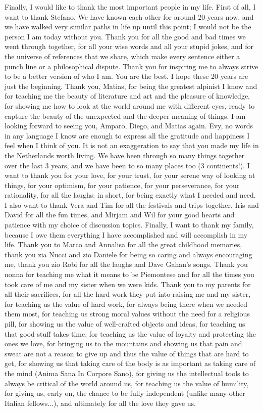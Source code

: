 Finally, I would like to thank the most important people in my life. First of all, I want to thank Stefano. We have known each other for around 20 years now, and we have walked very similar paths in life up until this point; I would not be the person I am today without you. Thank you for all the good and bad times we went through together, for all your wise words and all your stupid jokes, and for the universe of references that we share, which make every sentence either a punch line or a philosophical dispute. Thank you for inspiring me to always strive to be a better version of who I am. You are the best. I hope these 20 years are just the beginning. Thank you, Matias, for being the greatest alpinist I know and for teaching me the beauty of literature and art and the pleasure of knowledge, for showing me how to look at the world around me with different eyes, ready to capture the beauty of the unexpected and the deeper meaning of things. I am looking forward to seeing you, Amparo, Diego, and Matias again.
Evy, no words in any language I know are enough to express all the gratitude and happiness I feel when I think of you. It is not an exaggeration to say that you made my life in the Netherlands worth living. We have been through so many things together over the last 3 years, and we have been to so many places too (3 continents!). I want to thank you for your love, for your trust, for your serene way of looking at things, for your optimism, for your patience, for your perseverance, for your rationality, for all the laughs: in short, for being exactly what I needed and need. I also want to thank Vera and Tim for all the festivals and trips together, Iris and David for all the fun times, and Mirjam and Wil for your good hearts and patience with my choice of discussion topics. Finally, I want to thank my family, because I owe them everything I have accomplished and will accomplish in my life. Thank you to Marco and Annalisa for all the great childhood memories, thank you zia Nucci and zio Daniele for being so caring and always encouraging me, thank you zio Robi for all the laughs and Dave Gahan's songs. Thank you nonna for teaching me what it means to be Piemontese and for all the times you took care of me and my sister when we were kids. Thank you to my parents for all their sacrifices, for all the hard work they put into raising me and my sister, for teaching us the value of hard work, for always being there when we needed them most, for teaching us strong moral values without the need for a religious pill, for showing us the value of well-crafted objects and ideas, for teaching us that good stuff takes time, for teaching us the value of loyalty and protecting the ones we love, for bringing us to the mountains and showing us that pain and sweat are not a reason to give up and thus the value of things that are hard to get, for showing us that taking care of the body is as important as taking care of the mind (Anima Sana In Corpore Sano), for giving us the intellectual tools to always be critical of the world around us, for teaching us the value of humility, for giving us, early on, the chance to be fully independent (unlike many other Italian fellows...), and ultimately for all the love they gave us.